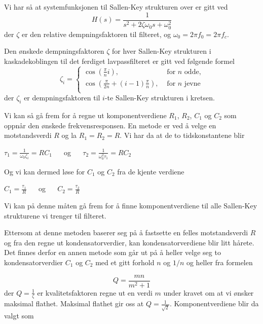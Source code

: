 Vi har så at systemfunksjonen til Sallen-Key strukturen over er gitt ved
\begin{equation}
    H(s) = \frac{1}{s^2 + 2\zeta\omega_0 s + \omega_0^2}
\end{equation}
der $\zeta$ er den relative dempningsfaktoren til filteret, og $\omega_0 = 2\pi f_0 = 2\pi f_c$.

Den ønskede dempningsfaktoren $\zeta$ for hver Sallen-Key strukturen i kaskadekoblingen til det ferdiget 
lavpassfilteret er gitt ved følgende formel
\begin{equation}
    \zeta_i = \begin{cases}
        \cos\left(\frac{\pi}{n}i\right), & \text{ for $n$ odde,} \\
        \cos\left(\frac{\pi}{2n} + (i - 1)\frac{\pi}{n}\right), & \text{ for $n$ jevne} \\
    \end{cases}
\end{equation}
der $\zeta_i$ er dempningsfaktoren til $i$-te Sallen-Key strukturen i kretsen.

Vi kan så gå frem for å regne ut komponentverdiene $R_1$, $R_2$, $C_1$ og $C_2$ som oppnår den ønskede frekvensresponsen.
En metode er ved å velge en motstandsverdi $R$ og la $R_1 = R_2 = R$. Vi har da at de to tidskonstantene blir
\begin{center}
    $\tau_1 = \frac{1}{\omega_0 \zeta_i} = R C_1\:\:\:\:\:\:$ og $\:\:\:\:\:\: \tau_2 = \frac{1}{\omega_0^2\tau_1} = R C_2$
\end{center}

Og vi kan dermed løse for $C_1$ og $C_2$ fra de kjente verdiene
\begin{center}
    $C_1 = \frac{\tau_1}{R}\:\:\:\:\:\:$ og $\:\:\:\:\:\: C_2 = \frac{\tau_2}{R}$
\end{center}
Vi kan på denne måten gå frem for å finne komponentverdiene til alle Sallen-Key strukturene vi trenger til filteret.

Ettersom at denne metoden baserer seg på å fastsette en felles motstandsverdi $R$ og fra den regne ut kondensatorverdier,
kan kondensatorverdiene blir litt hårete. Det finnes derfor en annen metode \cite{sallen-key-lowpass-wikipedia} som går ut på 
å heller velge seg to kondensatorverdier $C_1$ og $C_2$ med et gitt forhold $n$ og $1/n$ og heller fra formelen

\[
    Q = \frac{mn}{m^2 + 1}
\]
der $Q = \frac{1}{\zeta}$ er kvalitetsfaktoren regne ut en verdi $m$ under kravet om at vi ønsker maksimal flathet.
Maksimal flathet gir oss at $Q = \frac{1}{\sqrt{2}}$. Komponentverdiene blir da valgt som

